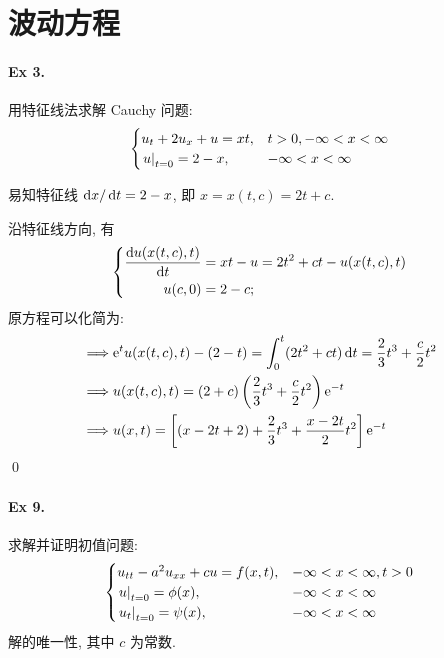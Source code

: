 \section{波动方程}
\paragraph{Ex 3.}
用特征线法求解 Cauchy 问题:
\[ \begin{cases}
u_t + 2u_x + u = xt, & t > 0, -\infty < x < \infty \\
{\left.{u} \right|}_{t=0} = 2 - x, & -\infty < x < \infty
\end{cases} \]

\solution
易知特征线 $\operatorname{d\!} x /\operatorname{d\!} t = 2 - x$, 即 $x = x(t, c) = 2t + c$.

沿特征线方向, 有
\[ {\left\{ \begin{aligned} 
	\frac{\operatorname{d\!} u(x(t, c), t)}{\operatorname{d\!} t} &= xt - u = 2t^2 + ct - u(x(t, c), t) \\
	u(c, 0) &= 2 - c;
 \end{aligned} \right.} \]
原方程可以化简为:
\[ \begin{aligned}
\implies & {\mathrm e}^t u(x(t, c), t) - (2 - t) = \int_0^t (2t^2+ct)\operatorname{d\!} t =
  \frac23 t^3 + \frac{c}{2} t^2 \\
\implies & u(x(t,c),t) = (2+c)\left(\frac23 t^3+\frac{c}{2}t^2\right){\mathrm e}^{-t} \\
\implies & u(x,t) = \left[(x - 2t+ 2) + \frac23 t^3 + \frac{x-2t}{2}t^2 \right]
  {\mathrm e}^{-t} \\
\end{aligned} \]
\qed

\paragraph{Ex 9.}
求解并证明初值问题:
\[ \begin{cases}
u_{tt} - a^2 u_{xx} + cu = f(x, t), & -\infty < x < \infty, t > 0 \\
{\left.{u} \right|}_{t=0} = \phi(x), & -\infty < x < \infty \\
{\left.{u_t} \right|}_{t=0} = \psi(x), & -\infty < x < \infty
\end{cases} \]
解的唯一性, 其中 $c$ 为常数.

